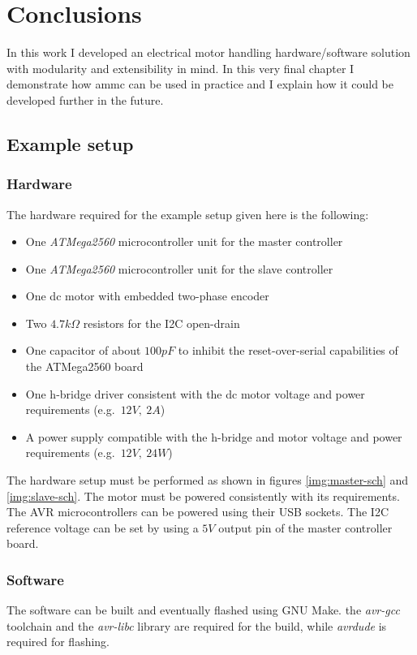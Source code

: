 \chapter{Conclusions}
\label{ch:conclusions}
In this work I developed an electrical motor handling hardware/software
solution with modularity and extensibility in mind. In this very final chapter
I demonstrate how ammc can be used in practice and I explain how it could be
developed further in the future.

\section{Example setup}

\subsection{Hardware}
The hardware required for the example setup given here is the following:
\begin{itemize}
  \item One \emph{ATMega2560} microcontroller unit for the master controller
  \item One \emph{ATMega2560} microcontroller unit for the slave controller
  \item One dc motor with embedded two-phase encoder
  \item Two $4.7 k\Omega$ resistors for the I2C open-drain
  \item One capacitor of about $100 pF$ to inhibit the reset-over-serial
    capabilities of the ATMega2560 board
  \item One h-bridge driver consistent with the dc motor voltage and power
    requirements (e.g.\ $12 V,\ 2 A$)
  \item A power supply compatible with the h-bridge and motor voltage and
    power requirements (e.g.\ $12 V,\ 24 W$)
\end{itemize}

The hardware setup must be performed as shown in figures \ref{img:master-sch}
and \ref{img:slave-sch}.
The motor must be powered consistently with its requirements. The AVR
microcontrollers can be powered using their USB sockets. The I2C reference
voltage can be set by using a $5 V$ output pin of the master controller board.

\subsection{Software}
The software can be built and eventually flashed using GNU Make. the
\emph{avr-gcc} toolchain and the \emph{avr-libc} library are required for the
build, while \emph{avrdude} is required for flashing.

